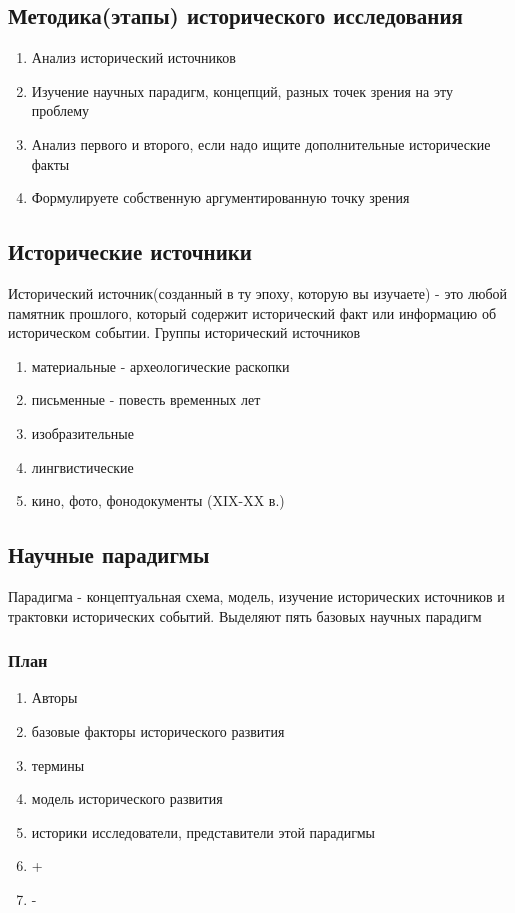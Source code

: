 \documentclass[a4paper]{article}
\begin{document}
\subsection{Методика(этапы) исторического исследования}

\begin{enumerate}
    \item Анализ исторический источников
    \item Изучение научных парадигм, концепций, разных точек зрения на эту проблему
    \item Анализ первого и второго, если надо ищите дополнительные исторические факты
    \item Формулируете собственную аргументированную точку зрения
\end{enumerate}

\subsection{Исторические источники}
Исторический источник(созданный в ту эпоху, которую вы изучаете) - это любой памятник прошлого,
который содержит исторический факт или информацию об историческом событии.
Группы исторический источников

\begin{enumerate}
    \item материальные - археологические раскопки
    \item письменные - повесть временных лет
    \item изобразительные
    \item лингвистические
    \item кино, фото, фонодокументы (XIX-XX в.)
\end{enumerate}

\subsection{Научные парадигмы}
Парадигма - концептуальная схема, модель, изучение исторических источников и трактовки исторических событий.
Выделяют пять базовых научных парадигм

\subsubsection{План}
\begin{enumerate}
    \item Авторы
    \item базовые факторы исторического развития
    \item термины
    \item модель исторического развития
    \item историки исследователи, представители этой парадигмы
    \item +
    \item -
\end{enumerate}
\end{document}
